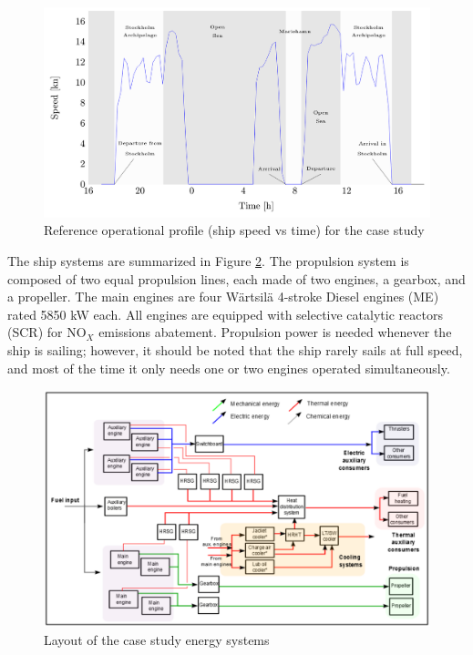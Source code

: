 \documentclass[preprint,12pt]{elsarticle}
\begin{document}
\begin{figure}
	\centering
	\includegraphics[width=0.95\linewidth]{Figures/ShipOperationalProfile}
	\caption{Reference operational profile (ship speed vs time) for the case study}
	\label{fig:typicalShipOperations}
\end{figure}


The ship systems are summarized in Figure \ref{fig:shipSystems}. The propulsion system is composed of two equal propulsion lines, each made of two engines, a gearbox, and a propeller. The main engines are four W\"{a}rtsil\"{a} 4-stroke Diesel engines (ME) rated 5850 kW each. All engines are equipped with selective catalytic reactors (SCR) for NO$_X$ emissions abatement. Propulsion power is needed whenever the ship is sailing; however, it should be noted that the ship rarely sails at full speed, and most of the time it only needs one or two engines operated simultaneously.

\begin{figure}
	\centering
	\includegraphics[width=0.95\linewidth]{Figures/ShipLayout}
	\caption{Layout of the case study energy systems}
	\label{fig:shipSystems}
\end{figure}
\end{document}
